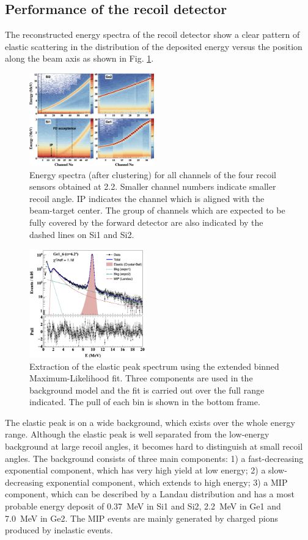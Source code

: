 \documentclass[number,5p]{elsarticle}
\begin{document}
\subsection{Performance of the recoil detector}
\label{sec:recoil_performance}
The reconstructed energy spectra of the recoil detector show a clear pattern
of elastic scattering in the distribution of the deposited energy versus the
position along the beam axis as shown in Fig. \ref{fig:e_map}.
\begin{figure}[b!]
  \centering
  \includegraphics[width=0.48\textwidth]{./e_map.png}
  \caption{Energy spectra (after clustering) for all channels of the four recoil sensors obtained at \SI{2.2}{\momentum}.
    Smaller channel numbers indicate smaller recoil angle.
    IP indicates the channel which is aligned with
    the beam-target center.
    The group of channels which are expected to be fully covered by the forward detector are
    also indicated by the dashed lines on Si1 and Si2.
  }
  \label{fig:e_map}
\end{figure}
\begin{figure}[b!]
  \centering
  \includegraphics[width=0.45\textwidth]{./e_fit.png}
  \caption{Extraction of the elastic peak spectrum using the extended binned
    Maximum-Likelihood fit. Three components are used in the background model
    and the fit is carried out over the full range indicated. The pull of each bin
    is shown in the bottom frame.}
  \label{fig:e_fit}
\end{figure}
The elastic peak is on a wide background, which exists over the whole energy range.
Although the elastic peak is well separated from the low-energy background at
large recoil angles, it becomes hard to distinguish at small recoil angles.
The background consists of three main components:
1) a fast-decreasing exponential component, which has very high yield at low energy;
2) a slow-decreasing exponential component, which extends to high energy;
3) a MIP component, which can be described by a Landau distribution and has a most probable energy deposit of \SI{0.37}{\MeV} in Si1 and Si2, \SI{2.2}{\MeV} in Ge1 and \SI{7.0}{\MeV} in Ge2.
The MIP events are mainly generated by charged pions produced by inelastic events.
\end{document}
